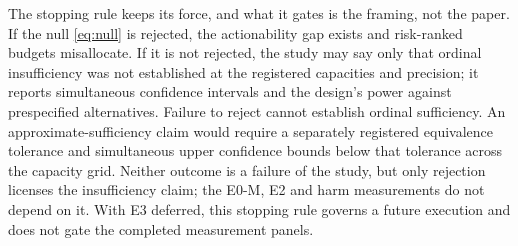 The stopping rule keeps its force, and what it gates is the framing, not the
paper.  If the null \eqref{eq:null} is rejected, the actionability gap exists
and risk-ranked budgets misallocate.  If it is not rejected, the study may say
only that ordinal insufficiency was not established at the registered
capacities and precision; it reports simultaneous confidence intervals and the
design's power against prespecified alternatives.  Failure to reject cannot
establish ordinal sufficiency.  An approximate-sufficiency claim would require
a separately registered equivalence tolerance and simultaneous upper confidence
bounds below that tolerance across the capacity grid.  Neither outcome is a
failure of the study, but only rejection licenses the insufficiency
claim; the E0-M, E2 and harm measurements do not depend on it.  With E3
deferred, this stopping rule governs a future execution and does not gate the
completed measurement panels.
